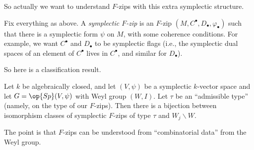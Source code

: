 \documentclass{article}
\begin{document}
So actually we want to understand $F$-zips with this extra symplectic structure.
\begin{definition}
	Fix everything as above. A \textit{symplectic $F$-zip} is an $F$-zip $(M,C^\bullet,D_\bullet,\varphi_\bullet)$ such that there is a symplectic form $\psi$ on $M$, with some coherence conditions. For example, we want $C^\bullet$ and $D_\bullet$ to be symplectic flags (i.e., the symplectic dual spaces of an element of $C^\bullet$ lives in $C^\bullet$, and similar for $D_\bullet$).
\end{definition}
So here is a classification result.
\begin{theorem}
	Let $k$ be algebraically closed, and let $(V,\psi)$ be a symplectic $k$-vector space and let $G=\op{Sp}(V,\psi)$ with Weyl group $(W,I)$. Let $\tau$ be an ``admissible type'' (namely, on the type of our $F$-zips). Then there is a bijection between isomorphism classes of symplectic $F$-zips of type $\tau$ and $W_j\backslash W$.
\end{theorem}
The point is that $F$-zips can be understood from ``combinatorial data'' from the Weyl group.
\end{document}
